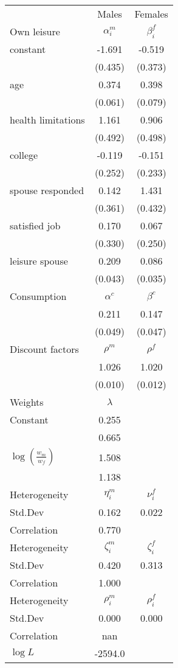 \begin{tabular}{lcc} 
\hline\hline 
 & Males & Females \\ 
Own leisure & $\alpha_{i}^{m}$ & $\beta_{i}^{f}$ \\ 
constant & -1.691 & -0.519 \\ 
 & (0.435) & (0.373) \\ 
age & 0.374 & 0.398 \\ 
 & (0.061) & (0.079) \\ 
health limitations & 1.161 & 0.906 \\ 
 & (0.492) & (0.498) \\ 
college & -0.119 & -0.151 \\ 
 & (0.252) & (0.233) \\ 
spouse responded & 0.142 & 1.431 \\ 
 & (0.361) & (0.432) \\ 
satisfied job & 0.170 & 0.067 \\ 
 & (0.330) & (0.250) \\ 
leisure spouse & 0.209 & 0.086 \\ 
 & (0.043) & (0.035) \\ 
Consumption & $\alpha^{c}$ & $\beta^{c}$ \\ 
 & 0.211 & 0.147 \\ 
 & (0.049) & (0.047) \\ 
Discount factors & $\rho^m$ & $\rho^f$ \\ 
 & 1.026 & 1.020 \\ 
 & (0.010) & (0.012) \\ 
Weights & $\lambda$ &  \\ 
Constant & 0.255 &  \\ 
 & 0.665 &  \\ 
$\log(\frac{w_m}{w_f})$ & 1.508 &  \\ 
 & 1.138 &  \\ 
Heterogeneity & $\eta_i^m$ & $\nu_i^f$ \\ 
Std.Dev & 0.162 & 0.022 \\ 
Correlation & 0.770 &  \\ 
Heterogeneity & $\zeta_i^m$ & $\zeta_i^f$ \\ 
Std.Dev & 0.420 & 0.313 \\ 
Correlation & 1.000 &  \\ 
Heterogeneity & $\rho_i^m$ & $\rho_i^f$ \\ 
Std.Dev & 0.000 & 0.000 \\ 
Correlation & nan &  \\ 
\hline 
$\log L$ & -2594.0 & \\ 
\hline \hline 
\end{tabular} 
